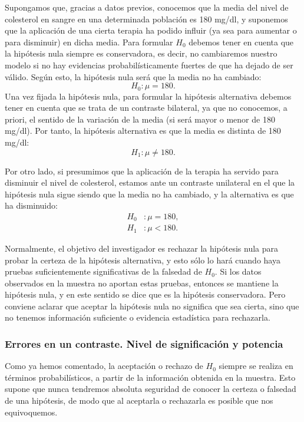 \begin{ejemplo}
Supongamos que, gracias a datos previos, conocemos que la media del nivel de
colesterol en sangre en una determinada población es 180 mg/dl, y suponemos que
la aplicación de una cierta terapia ha podido influir (ya sea para aumentar o
para disminuir) en dicha media. Para formular $H_0$ debemos tener en cuenta que
la hipótesis nula siempre es conservadora, es decir, no cambiaremos nuestro
modelo si no hay evidencias probabilísticamente fuertes de que ha dejado de ser
válido. Según esto, la hipótesis nula será que la media no ha cambiado:
\[
H_0: \mu = 180.
\]
Una vez fijada la hipótesis nula, para formular la hipótesis alternativa
debemos tener en cuenta que se trata de un contraste bilateral, ya que no
conocemos, a priori, el sentido de la variación de la media (si será mayor o
menor de 180 mg/dl). Por tanto, la hipótesis alternativa es que la media es
distinta de 180 mg/dl:
\[H_1: \mu \neq 180.\]

Por otro lado, si presumimos que la aplicación de la terapia ha servido para
disminuir el nivel de colesterol, estamos ante un contraste
unilateral en el que la hipótesis nula sigue siendo que la media
no ha cambiado, y la alternativa es que ha
disminuido:
\begin{align*}
H_0 &: \mu = 180,\\
H_1 &: \mu < 180.
\end{align*}
\end{ejemplo}

Normalmente, el objetivo del investigador es rechazar la hipótesis nula para
probar la certeza de la hipótesis alternativa, y esto sólo lo hará cuando haya
pruebas suficientemente significativas de la falsedad de $H_0$. Si los datos
observados en la muestra no aportan estas pruebas, entonces se mantiene la
hipótesis nula, y en este sentido se dice que es la hipótesis conservadora.
Pero conviene aclarar que aceptar la hipótesis nula no significa que sea
cierta, sino que no tenemos información suficiente o evidencia estadística
para rechazarla.

\subsubsection{Errores en un contraste. Nivel de significación y potencia}

Como ya hemos comentado, la aceptación o rechazo de $H_0$ siempre se realiza en
términos probabilísticos, a partir de la información obtenida en la muestra.
Esto supone que nunca tendremos absoluta seguridad de conocer la certeza o
falsedad de una hipótesis, de modo que al aceptarla o rechazarla es posible
que nos equivoquemos.

